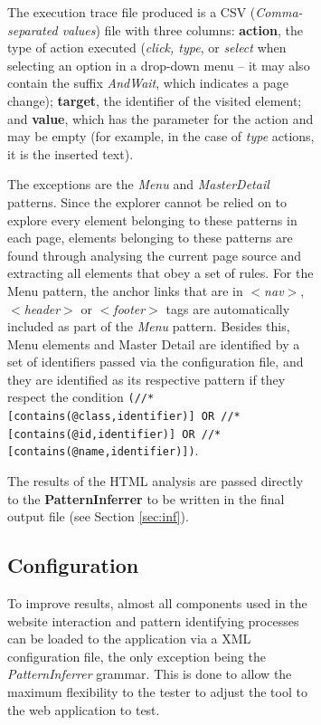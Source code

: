 \documentclass[conference]{IEEEtran}
\begin{document}
\begin{enumerate}
\begin{figure}[!htb]
\begin{itemize}
\begin{figure}[!htb]
The execution trace file produced is a CSV (\textit{Comma-separated values}) file with three columns: \textbf{action}, the type of action executed (\textit{click, type}, or \textit{select} when selecting an option in a drop-down menu -- it may also contain the suffix \textit{AndWait}, which indicates a page change); \textbf{target}, the identifier of the visited element; and \textbf{value}, which has the parameter for the action and may be empty (for example, in the case of \textit{type} actions, it is the inserted text).

The exceptions are the \textit{Menu} and \textit{MasterDetail} patterns. Since the explorer cannot be relied on to explore every element belonging to these patterns in each page, elements belonging to these patterns are found through analysing the current page source and extracting all elements that obey a set of rules. For the Menu pattern, the anchor links that are in \textit{$<$nav$>$}, \textit{$<$header$>$} or \textit{$<$footer$>$} tags are automatically included as part of the \textit{Menu} pattern. Besides this, Menu elements and Master Detail are identified by a set of identifiers passed via the configuration file, and they are identified as its respective pattern if they respect the condition \texttt{(//*[contains(@class,identifier)] OR //*[contains(@id,identifier)] OR //*[contains(@name,identifier)])}.

The results of the HTML analysis are passed directly to the \textbf{PatternInferrer} to be written in the final output file (see Section \ref{sec:inf}).

\subsection{Configuration}\label{sec:conf}
To improve results, almost all components used in the website interaction and pattern identifying processes can be loaded to the application via a XML configuration file, the only exception being the \textit{PatternInferrer} grammar. This is done to allow the maximum flexibility to the tester to adjust the tool to the web application to test.


\end{figure}
\end{itemize}
\end{figure}
\end{enumerate}
\end{document}
